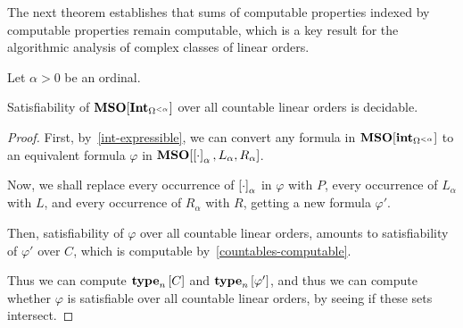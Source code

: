 The next theorem establishes that sums of computable properties indexed by computable properties remain computable, which is
a key result for the algorithmic analysis of complex classes of linear orders.

\begin{theorem}\label{single-ordinal-satisfiability}
  Let $\alpha > 0$ be an ordinal.

  Satisfiability of $\mathbf{MSO}[\mathbf{Int}_{\Omega^{< \alpha}}]$ 
  over all countable linear orders is decidable.
\end{theorem}

\begin{proof}
  First, by~\cref{int-expressible}, we can convert
  any formula in $\mathbf{MSO}[\mathbf{int}_{\Omega^{< \alpha}}]$
  to an equivalent formula $\varphi$ in $\mathbf{MSO}[\left[ {\cdot} \right]_{\alpha}, L_{\alpha}, R_{\alpha}]$.

  Now, we shall replace every occurrence of $\left[ {\cdot} \right]_{\alpha}$ in $\varphi$ with $P$,
  every occurrence of $L_{\alpha}$ with $L$,
  and every occurrence of $R_{\alpha}$ with $R$,
  getting a new formula $\varphi'$.

  Then, satisfiability of $\varphi$ over all countable linear orders,
  amounts to satisfiability of $\varphi'$ over $C$,
  which is computable by~\cref{countables-computable}.

  Thus we can compute $\mathbf{type}_{n} \left[ {C} \right]$ and $\mathbf{type}_{n} \left[ {\varphi'} \right]$,
  and thus we can compute whether $\varphi$ is satisfiable over all countable linear orders,
  by seeing if these sets intersect.
\end{proof}
